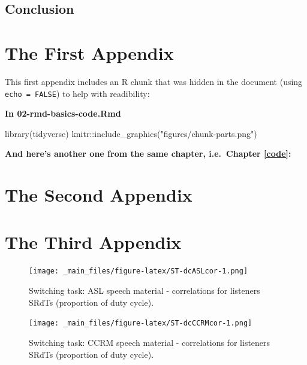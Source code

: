 \documentclass[a4paper, twoside]{templates/ociamthesis}
\newenvironment{Shaded}{\begin{snugshade}}{\end{snugshade}}
\newcommand{\FunctionTok}[1]{\textcolor[rgb]{0.00,0.00,0.00}{#1}}
\newcommand{\NormalTok}[1]{#1}
\newcommand{\SpecialCharTok}[1]{\textcolor[rgb]{0.00,0.00,0.00}{#1}}
\newcommand{\StringTok}[1]{\textcolor[rgb]{0.31,0.60,0.02}{#1}}
\renewenvironment{Shaded}
{
  \vspace{4pt}%
  \begin{snugshade}%
}{%
  \end{snugshade}%
  \vspace{4pt}%
}
\begin{document}
\hypertarget{conclusion-3}{%
\section*{Conclusion}\label{conclusion-3}}

\startappendices

\hypertarget{the-first-appendix}{%
\chapter{The First Appendix}\label{the-first-appendix}}

This first appendix includes an R chunk that was hidden in the document (using \texttt{echo\ =\ FALSE}) to help with readibility:

\textbf{In 02-rmd-basics-code.Rmd}

\begin{Shaded}
\begin{Highlighting}[]
\FunctionTok{library}\NormalTok{(tidyverse)}
\NormalTok{knitr}\SpecialCharTok{::}\FunctionTok{include\_graphics}\NormalTok{(}\StringTok{"figures/chunk{-}parts.png"}\NormalTok{)}
\end{Highlighting}
\end{Shaded}

\textbf{And here's another one from the same chapter, i.e.~Chapter \ref{code}:}

\hypertarget{the-second-appendix}{%
\chapter{The Second Appendix}\label{the-second-appendix}}

\hypertarget{the-third-appendix}{%
\chapter{The Third Appendix}\label{the-third-appendix}}

\begin{figure}
\centering
\texttt{[image: \_main\_files/figure-latex/ST-dcASLcor-1.png]}
\caption{\label{fig:ST-dcASLcor} Switching task: ASL speech material - correlations for listeners SRdTs (proportion of duty cycle).}
\end{figure}

\begin{figure}
\centering
\texttt{[image: \_main\_files/figure-latex/ST-dcCCRMcor-1.png]}
\caption{\label{fig:ST-dcCCRMcor} Switching task: CCRM speech material - correlations for listeners SRdTs (proportion of duty cycle).}
\end{figure}
\end{document}
